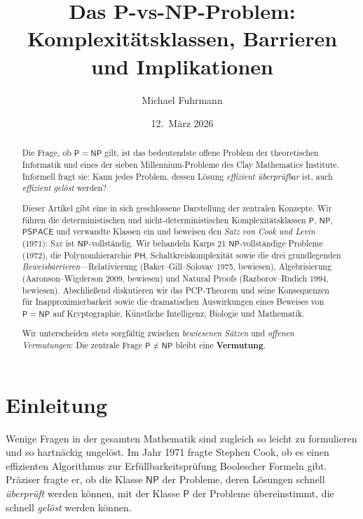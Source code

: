 \documentclass[12pt,a4paper]{amsart}
\title[Das P-vs-NP-Problem]{%
  Das P-vs-NP-Problem:\\
  Komplexitätsklassen, Barrieren und Implikationen}
\author{Michael Fuhrmann}
\date{12.\ März 2026}
\theoremstyle{definition}
\newcommand{\Pclass}{\mathsf{P}}
\newcommand{\NP}{\mathsf{NP}}
\newcommand{\PSPACE}{\mathsf{PSPACE}}
\newcommand{\PH}{\mathsf{PH}}
\newcommand{\SAT}{\textsc{Sat}}
\begin{document}
\begin{abstract}
Die Frage, ob $\Pclass = \NP$ gilt, ist das bedeutendste offene Problem der
theoretischen Informatik und eines der sieben Millennium-Probleme des Clay
Mathematics Institute.  Informell fragt sie: Kann jedes Problem, dessen Lösung
\emph{effizient überprüfbar} ist, auch \emph{effizient gelöst} werden?

Dieser Artikel gibt eine in sich geschlossene Darstellung der zentralen
Konzepte.  Wir führen die deterministischen und nicht-deterministischen
Komplexitätsklassen $\Pclass$, $\NP$, $\PSPACE$ und verwandte Klassen ein
und beweisen den \emph{Satz von Cook und Levin} (1971): \SAT{} ist
$\NP$-vollständig.  Wir behandeln Karps 21 $\NP$-vollständige Probleme (1972),
die Polynomhierarchie $\PH$, Schaltkreiskomplexität sowie die drei
grundlegenden \emph{Beweisbarrieren}---Relativierung (Baker--Gill--Solovay
1975, bewiesen), Algebrisierung (Aaronson--Wigderson 2009, bewiesen) und
Natural Proofs (Razborov--Rudich 1994, bewiesen).  Abschließend diskutieren
wir das PCP-Theorem und seine Konsequenzen für Inapproximierbarkeit sowie
die dramatischen Auswirkungen eines Beweises von $\Pclass = \NP$ auf
Kryptographie, Künstliche Intelligenz, Biologie und Mathematik.

Wir unterscheiden stets sorgfältig zwischen \emph{bewiesenen Sätzen} und
\emph{offenen Vermutungen}: Die zentrale Frage $\Pclass \neq \NP$ bleibt eine
\textbf{Vermutung}.
\end{abstract}

\maketitle

\tableofcontents

\section{Einleitung}

Wenige Fragen in der gesamten Mathematik sind zugleich so leicht zu formulieren
und so hartnäckig ungelöst.  Im Jahr 1971 fragte Stephen Cook, ob es einen
effizienten Algorithmus zur Erfüllbarkeitsprüfung Boolescher Formeln gibt.
Präziser fragte er, ob die Klasse $\NP$ der Probleme, deren Lösungen schnell
\emph{überprüft} werden können, mit der Klasse $\Pclass$ der Probleme
übereinstimmt, die schnell \emph{gelöst} werden können.
\end{document}
